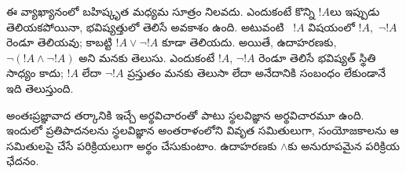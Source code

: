 \documentclass[../../../include/open-logic-section]{subfiles}
\begin{document}
ఈ వ్యాఖ్యానంలో బహిష్కృత మధ్యమ సూత్రం
నిలవదు. ఎందుకంటే కొన్ని $!A$లు ఇప్పుడు తెలియకపోయినా,
భవిష్యత్తులో తెలిసే అవకాశం ఉంది.
అటువంటి ~$!A$
విషయంలో $!A$,~$\lnot !A$ రెండూ తెలియవు;
కాబట్టి $!A \lor \lnot !A$ కూడా తెలియదు.
అయితే, ఉదాహరణకు, $\lnot(!A
\land \lnot !A)$ అని మనకు తెలుసు.
ఎందుకంటే $!A$, $\lnot !A$ రెండూ తెలిసే
భవిష్యత్ స్థితి సాధ్యం కాదు; $!A$ లేదా
$\lnot !A$ ప్రస్తుతం మనకు తెలుసా లేదా
అనేదానికి సంబంధం లేకుండానే ఇది తెలుస్తుంది.

అంతఃప్రజ్ఞావాద తర్కానికి 
ఇచ్చే అర్థవిచారంతో పాటు స్థలవిజ్ఞాన అర్థవిచారమూ ఉంది.
ఇందులో ప్రతిపాదనలను స్థలవిజ్ఞాన అంతరాళంలోని వివృత
సమితులుగా, సంయోజకాలను ఆ సమితులపై చేసే పరిక్రియలుగా
అర్థం చేసుకుంటాం. ఉదాహరణకు $\land$కు అనురూపమైన
పరిక్రియ ఛేదనం.
\end{document}
